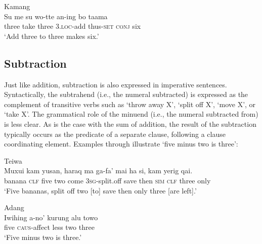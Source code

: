 \ea%
\label{bkm:Ref342663723}
{\upshape Kamang}\\
\gll   Su  me  su  wo-tte  an-ing  bo  taama\\  
   three   take  three  3.\textsc{loc}{}-add  thus-\textsc{set}   \textsc{conj}  six  \\
\glt `Add three to three makes six.'  
\z



 

  

\subsection{Subtraction}
\label{sec:8:Subtraction}
Just like addition, subtraction is also expressed in imperative sentences. Syntactically, the subtrahend (i.e., the numeral subtracted) is expressed as the complement of transitive verbs such as `throw away X', `split off X', `move X', or `take X'. The grammatical role of the minuend (i.e., the numeral subtracted from) is less clear. As is the case with the sum of addition, the result of the subtraction typically occurs as the predicate of a separate clause, following a clause coordinating element. Examples  through  illustrate `five minus two is three':


 

\ea
\label{ex:8:1240}
{\upshape Teiwa}\\
 \gll Muxui  kam  yusan,     haraq  ma  ga-fa'   mai   ha  si,  kam  yerig   qai.      \\
    banana  \textsc{clf}  five   two  come  \textsc{3sg-}split.off  save  then  \textsc{sim}  \textsc{clf} three  only    \\
 \glt `Five bananas,    split off two [to] save then only three [are left].' 
\z
 
\ea
\label{ex:8:1241}
{\upshape Adang}\\ 
\gll Iwihing  a-no'   kurung  alu  towo\\
 five  \textsc{caus}{}-affect  less  two  three\\
\glt `Five minus two is three.' 
\z  


